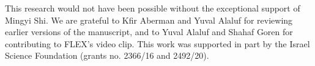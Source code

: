 This research
would not have been possible without the exceptional support of Mingyi Shi. 
We are grateful to Kfir Aberman and Yuval Alaluf for reviewing earlier versions of the manuscript, and to Yuval Alaluf and Shahaf Goren for contributing to FLEX's video clip.
This work was supported in part by the Israel Science Foundation (grants no. 2366/16 and 2492/20).